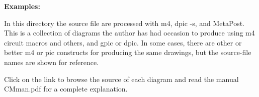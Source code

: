 \documentclass[11pt]{article}
\begin{document}
  \hfill
  {\large\bf Examples:
    
    }
  \hfill\break

  In this directory the source file are processed with m4, dpic -s,
  and MetaPost. 
  This is a collection of diagrams the author has had occasion to
  produce using m4 circuit macros and others, and gpic or dpic.  In
  some cases, there are other or better m4 or pic constructs for
  producing the same drawings, but the source-file names are shown for
  reference.

  Click on the link to browse the source of each diagram and
  read the manual CMman.pdf for a complete explanation.


\end{document}
